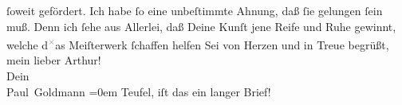 \begin{ledgroupsized}[t]{13cm}
               ſoweit gefördert. Ich habe ſo eine unbeſtimmte Ahnung, daß ſie gelungen ſein muß.
               Denn ich ſehe aus Allerlei, daß Deine Kunſt jene Reife und Ruhe gewinnt, welche d\substVorne{}\textsuperscript{\textcolor{gray}{×}}\substDazwischen{}a\substHinten{}s Meiſterwerk ſchaffen
                  helfen{\dotsfour}\pend
           \pstart
           Sei von Herzen und in Treue begrüßt, mein lieber Arthur!{\\[\baselineskip]} Dein{\\[\baselineskip]}\spacefill\mbox{Paul Goldmann}\pend
           \leftskip=0em{}\pstart
           \noindent{}Teufel, iſt das ein langer Brief!\pend
           
         
         \endnumbering{}\end{ledgroupsized}  \newcommand{\dateiname}{L02608}\newcommand{\titel}{Paul Goldmann an Arthur Schnitzler, 29. 7. [1894]}\newcommand{\editorInnen}{Martin Anton Müller und Laura Untner}
      
